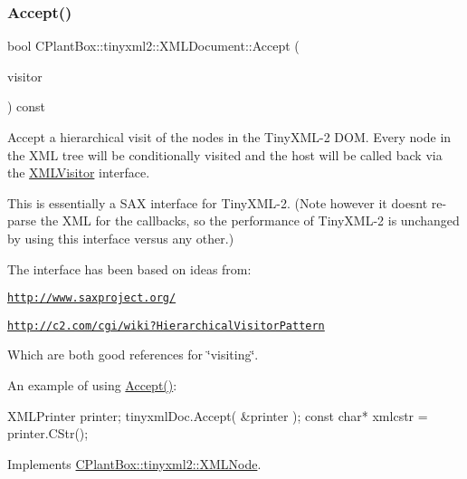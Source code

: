\subsubsection{\texorpdfstring{Accept()}{Accept()}}
{\footnotesize\ttfamily bool C\+Plant\+Box\+::tinyxml2\+::\+X\+M\+L\+Document\+::\+Accept (\begin{DoxyParamCaption}\item[{\hyperlink{classCPlantBox_1_1tinyxml2_1_1XMLVisitor}{X\+M\+L\+Visitor} $\ast$}]{visitor }\end{DoxyParamCaption}) const\hspace{0.3cm}{\ttfamily [virtual]}}

Accept a hierarchical visit of the nodes in the Tiny\+X\+M\+L-\/2 D\+OM. Every node in the X\+ML tree will be conditionally visited and the host will be called back via the \hyperlink{classCPlantBox_1_1tinyxml2_1_1XMLVisitor}{X\+M\+L\+Visitor} interface.

This is essentially a S\+AX interface for Tiny\+X\+M\+L-\/2. (Note however it doesn\textquotesingle{}t re-\/parse the X\+ML for the callbacks, so the performance of Tiny\+X\+M\+L-\/2 is unchanged by using this interface versus any other.)

The interface has been based on ideas from\+:


\begin{DoxyItemize}
\item \href{http://www.saxproject.org/}{\tt http\+://www.\+saxproject.\+org/}
\item \href{http://c2.com/cgi/wiki?HierarchicalVisitorPattern}{\tt http\+://c2.\+com/cgi/wiki?\+Hierarchical\+Visitor\+Pattern}
\end{DoxyItemize}

Which are both good references for \char`\"{}visiting\char`\"{}.

An example of using \hyperlink{classCPlantBox_1_1tinyxml2_1_1XMLDocument_acca54ff6fe186645813bc5ce00326653}{Accept()}\+: \begin{DoxyVerb}XMLPrinter printer;
tinyxmlDoc.Accept( &printer );
const char* xmlcstr = printer.CStr();
\end{DoxyVerb}
 

Implements \hyperlink{classCPlantBox_1_1tinyxml2_1_1XMLNode_a2cdc6f044bd1f971e211328e42a4f9d5}{C\+Plant\+Box\+::tinyxml2\+::\+X\+M\+L\+Node}.

\mbox{\label{classCPlantBox_1_1tinyxml2_1_1XMLDocument_adea3308f51d844c580cc29bb7bc5b32b}} 
